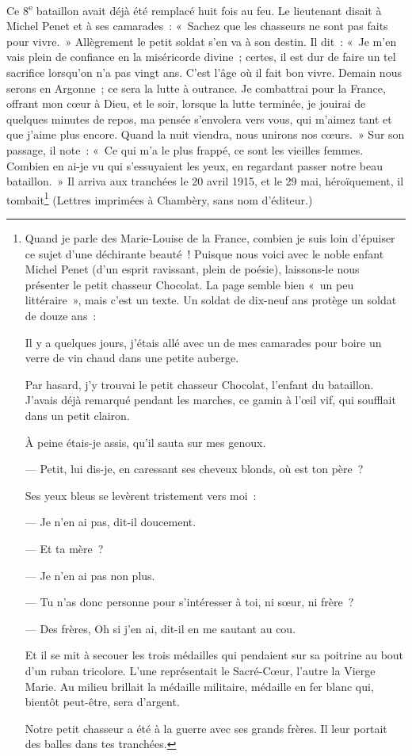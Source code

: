 \documentclass[french,twoside]{book} %
\def\mednobreak{\ifdim\lastskip<\medskipamount
  \removelastskip\nopagebreak\medskip\fi}
\newcommand{\bibl}[1]{{\RaggedLeft{#1}\par\bigskip}}
\newcommand{\labelblock}[1]{\medbreak{\noindent\color{rubric}\bfseries #1}\par\mednobreak}
\begin{document}
\noindent Ce 8\textsuperscript{e} bataillon avait déjà été remplacé huit fois au feu. Le lieutenant disait à Michel Penet et à ses camarades : « Sachez que les chasseurs ne sont pas faits pour vivre. » Allègrement le petit soldat s’en va à son destin. Il dit : « Je m’en vais plein de confiance en la miséricorde divine ; certes, il est dur de faire un tel sacrifice lorsqu’on n’a pas vingt ans. C’est l’âge où il fait bon vivre. Demain nous serons en Argonne ; ce sera la lutte à outrance. Je combattrai pour la France, offrant mon cœur à Dieu, et le soir, lorsque la lutte terminée, je jouirai de quelques minutes de repos, ma pensée s’envolera vers vous, qui m’aimez tant et que j’aime plus encore. Quand la nuit viendra, nous unirons nos cœurs. » Sur son passage, il note : « Ce qui m’a le plus frappé, ce sont les vieilles femmes. Combien en ai-je vu qui s’essuyaient les yeux, en regardant passer notre beau bataillon. » Il arriva aux tranchées le 20 avril 1915, et le 29 mai, héroïquement, il tombait\footnote{\noindent Quand je parle des Marie-Louise de la France, combien je suis loin d’épuiser ce sujet d’une déchirante beauté ! Puisque nous voici avec le noble enfant Michel Penet (d’un esprit ravissant, plein de poésie), laissons-le nous présenter le petit chasseur Chocolat. La page semble bien « un peu littéraire », mais c’est un texte. Un soldat de dix-neuf ans protège un soldat de douze ans :‌\par
  
\labelblock{14 février 1915.‌}

 \noindent Il y a quelques jours, j’étais allé avec un de mes camarades pour boire un verre de vin chaud dans une petite auberge.‌\par
 Par hasard, j’y trouvai le petit chasseur Chocolat, l’enfant du bataillon. J’avais déjà remarqué pendant les marches, ce gamin à l’œil vif, qui soufflait dans un petit clairon.‌\par
 À peine étais-je assis, qu’il sauta sur mes genoux.‌\par
 — Petit, lui dis-je, en caressant ses cheveux blonds, où est ton père ?‌\par
 Ses yeux bleus se levèrent tristement vers moi :‌\par
 — Je n’en ai pas, dit-il doucement.\par
 — Et ta mère ?‌\par
 — Je n’en ai pas non plus.\par
 — Tu n’as donc personne pour s’intéresser à toi, ni sœur, ni frère ?‌\par
 — Des frères, Oh si j’en ai, dit-il en me sautant au cou.‌\par
 Et il se mit à secouer les trois médailles qui pendaient sur sa poitrine au bout d’un ruban tricolore. L’une représentait le Sacré-Cœur, l’autre la Vierge Marie. Au milieu brillait la médaille militaire, médaille en fer blanc qui, bientôt peut-être, sera d’argent.‌\par
 Notre petit chasseur a été à la guerre avec ses grands frères. Il leur portait des balles dans tes tranchées.\par
 
\bibl{(Lettre de Michel Penet, du 14 février 1915.)}
 } (Lettres imprimées à Chambèry, sans nom d’éditeur.)‌\par
\end{document}
